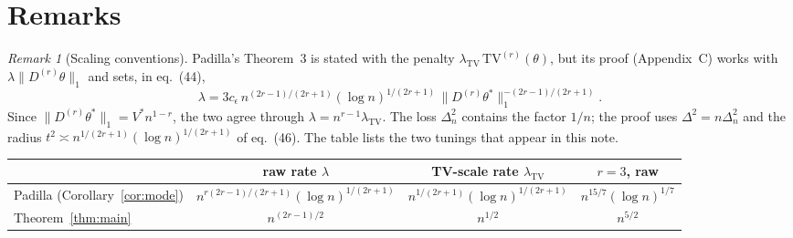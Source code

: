 \documentclass[11pt]{article}
\theoremstyle{definition}
\theoremstyle{remark}
\newtheorem{remark}{Remark}
\newcommand{\TV}{\mathrm{TV}}
\newcommand{\Dr}{D^{(r)}}
\newcommand{\lamtv}{\lambda_{\TV}}
\newcommand{\thetas}{\theta^{*}}
\begin{document}
\section{Remarks}

\begin{remark}[Scaling conventions]\label{rem:scale}
Padilla's Theorem~3 is stated with the penalty $\lamtv\,\TV^{(r)}(\theta)$, but its proof (Appendix~C) works with $\lambda\|\Dr\theta\|_1$ and sets, in eq.~(44),
\[
\lambda=3c_\epsilon\,n^{(2r-1)/(2r+1)}(\log n)^{1/(2r+1)}\,\|\Dr\thetas\|_1^{-(2r-1)/(2r+1)} .
\]
Since $\|\Dr\thetas\|_1=V^{*}n^{1-r}$, the two agree through $\lambda=n^{r-1}\lamtv$. The loss $\Delta_n^2$ contains the factor $1/n$; the proof uses $\Delta^2=n\Delta_n^2$ and the radius $t^2\asymp n^{1/(2r+1)}(\log n)^{1/(2r+1)}$ of eq.~(46). The table lists the two tunings that appear in this note.
\begin{center}
\begin{tabular}{lccc}
\toprule
 & raw rate $\lambda$ & TV-scale rate $\lamtv$ & $r=3$, raw \\
\midrule
Padilla (Corollary~\ref{cor:mode}) & $n^{r(2r-1)/(2r+1)}(\log n)^{1/(2r+1)}$ & $n^{1/(2r+1)}(\log n)^{1/(2r+1)}$ & $n^{15/7}(\log n)^{1/7}$\\
Theorem~\ref{thm:main} & $n^{(2r-1)/2}$ & $n^{1/2}$ & $n^{5/2}$\\
\bottomrule
\end{tabular}
\end{center}
\end{remark}
\end{document}
